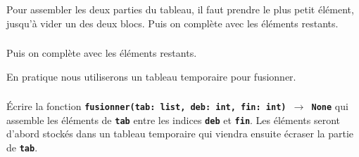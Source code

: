 \documentclass[svgnames,11pt]{beamer}
\begin{document}
\begin{frame}
    \frametitle{}

    Pour assembler les deux parties du tableau, il faut prendre le plus petit élément, jusqu'à vider un des deux blocs. Puis on complète avec les éléments restants.

    \begin{center}
    \end{center}
\end{frame}
\begin{frame}
    \frametitle{}

    Puis on complète avec les éléments restants.

    \begin{center}
    \end{center}
    \begin{aretenir}[Remarque]
        En pratique nous utiliserons un tableau temporaire pour fusionner.
    \end{aretenir}
\end{frame}
\begin{frame}
    \frametitle{}

    \begin{activite}
        Écrire la fonction \textbf{\texttt{fusionner(tab: list, deb: int, fin: int) $\rightarrow$ None}} qui assemble les éléments de \textbf{\texttt{tab}} entre les indices \textbf{\texttt{deb}} et \textbf{\texttt{fin}}. Les éléments seront d'abord stockés dans un tableau temporaire qui viendra ensuite écraser la partie de \textbf{\texttt{tab}}.
    \end{activite}

\end{frame}
\end{document}
